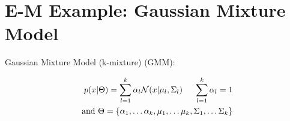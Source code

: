 \documentclass{article}
\begin{document}
%
%
%
%
%
%
%
%
%

\newpage

\section{E-M Example: Gaussian Mixture Model}

Gaussian Mixture Model (k-mixture) (GMM):

\begin{equation}
\begin{split}
p(x|\Theta) =  \sum_{l=1}^k \alpha_l \mathcal{N} (x | \mu_l, \Sigma_l) \hspace{5 mm} \sum_{l=1}^k \alpha_l = 1\\
\text{ and } \Theta = \{ \alpha_1, \dots \alpha_k, \mu_1, \dots \mu_k, \Sigma_1, \dots \Sigma_k \}\\
\end{split}
\end{equation}
\end{document}
